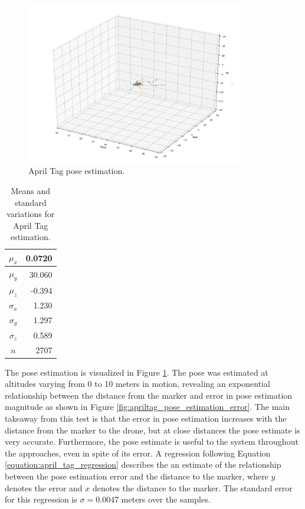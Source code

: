 \begin{figure}[ht]
    \centering
    \includegraphics[width=0.85\textwidth]{images/apriltag_pose_estimation.png}
    \caption{April Tag pose estimation.}
    \label{fig:apriltag_pose_estimation}
\end{figure}

\begin{table}[h]
    \centering
    \begin{tabular}{|c|r|}
    \hline
        $\mu_x$ &       0.0720\\\hline
        $\mu_y$ &       30.060\\\hline
        $\mu_z$ &       -0.394\\\hline
        $\sigma_x$ &    1.230\\\hline
        $\sigma_y$ &    1.297\\\hline
        $\sigma_z$ &    0.589\\\hline
        $n$ & 2707\\\hline
    \end{tabular}
    \caption{Means and standard variations for April Tag estimation.}
    \label{tab:stationary_apriltag_pose_estimation}
\end{table}

The pose estimation is visualized in Figure \ref{fig:apriltag_pose_estimation}. The pose was estimated at altitudes varying from 0 to 10 meters in motion, revealing an exponential relationship between the distance from the marker and error in pose estimation magnitude as shown in Figure \ref{fig:apriltag_pose_estimation_error}. The main takeaway from this test is that the error in pose estimation increases with the distance from the marker to the drone, but at close distances the pose estimate is very accurate. Furthermore, the pose estimate is useful to the system throughout the approaches, even in spite of its error. A regression following Equation \ref{equation:april_tag_regression} describes the an estimate of the relationship between the pose estimation error and the distance to the marker, where $y$ denotes the error and $x$ denotes the distance to the marker. The standard error for this regression is $\sigma = 0.0047$ meters over the samples.%

